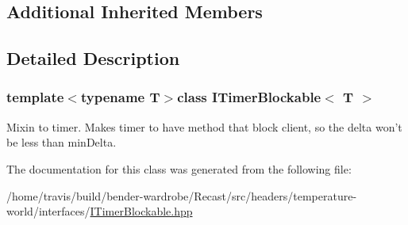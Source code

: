 \subsection*{Additional Inherited Members}


\subsection{Detailed Description}
\subsubsection*{template$<$typename T$>$class I\-Timer\-Blockable$<$ T $>$}

Mixin to timer. Makes timer to have method that block client, so the {\ttfamily delta} won't be less than {\ttfamily min\-Delta}. 

The documentation for this class was generated from the following file\-:\begin{DoxyCompactItemize}
\item 
/home/travis/build/bender-\/wardrobe/\-Recast/src/headers/temperature-\/world/interfaces/\hyperlink{_i_timer_blockable_8hpp}{I\-Timer\-Blockable.\-hpp}\end{DoxyCompactItemize}
